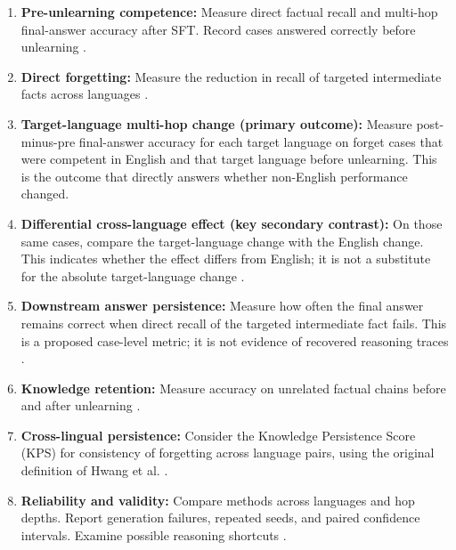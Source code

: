 \documentclass[10pt,a4paper]{article}
\begin{document}
\begin{enumerate}

    \item \textbf{Pre-unlearning competence:}
    Measure direct factual recall and multi-hop
    final-answer accuracy after SFT. Record cases
    answered correctly before unlearning
    \cite{waseem2026falsepositive}.

    \item \textbf{Direct forgetting:}
    Measure the reduction in recall of targeted
    intermediate facts across languages
    \cite{xiang2026multilingual}.

    \item \textbf{Target-language multi-hop change (primary outcome):}
    Measure post-minus-pre final-answer accuracy for each
    target language on forget cases that were competent in
    English and that target language before unlearning.
    This is the outcome that directly answers whether
    non-English performance changed.

    \item \textbf{Differential cross-language effect (key secondary contrast):}
    On those same cases, compare the target-language
    change with the English change. This indicates whether
    the effect differs from English; it is not a substitute
    for the absolute target-language change \cite{zhong2023mquake}.

    \item \textbf{Downstream answer persistence:}
    Measure how often the final answer remains
    correct when direct recall of the targeted
    intermediate fact fails. This is a proposed
    case-level metric; it is not evidence of
    recovered reasoning traces \cite{yang2025socrates}.

    \item \textbf{Knowledge retention:}
    Measure accuracy on unrelated factual chains
    before and after unlearning
    \cite{maini2024tofu}.

    \item \textbf{Cross-lingual persistence:}
    Consider the Knowledge Persistence Score (KPS)
    for consistency of forgetting across language
    pairs, using the original definition of
    Hwang et al. \cite{hwang2026knowledge}.

    \item \textbf{Reliability and validity:}
    Compare methods across languages and hop depths.
    Report generation failures, repeated seeds, and
    paired confidence intervals. Examine possible
    reasoning shortcuts \cite{yang2025socrates}.

\end{enumerate}
\end{document}
